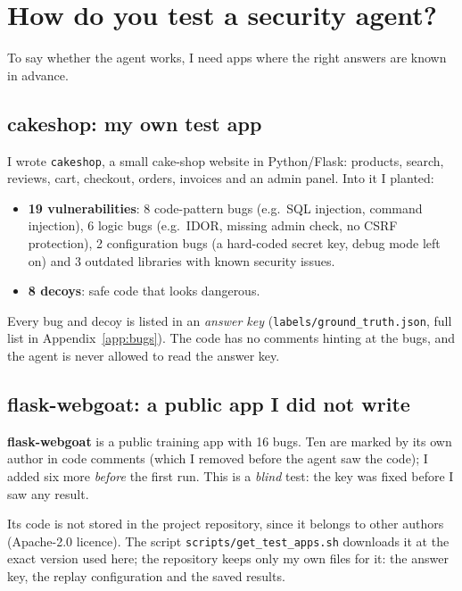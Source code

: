 \documentclass[11pt,a4paper]{article}
\newcommand{\code}[1]{\texttt{#1}}
\begin{document}
\section{How do you test a security agent?}

To say whether the agent works, I need apps where the right answers are known in advance.

\subsection{cakeshop: my own test app}
I wrote \code{cakeshop}, a small cake-shop website in Python/Flask: products, search, reviews, cart,
checkout, orders, invoices and an admin panel. Into it I planted:

\begin{itemize}
  \item \textbf{19 vulnerabilities}: 8 code-pattern bugs (e.g.\ SQL injection, command injection), 6 logic
        bugs (e.g.\ IDOR, missing admin check, no CSRF protection), 2 configuration bugs (a hard-coded
        secret key, debug mode left on) and 3 outdated libraries with known security issues.
  \item \textbf{8 decoys}: safe code that looks dangerous.
\end{itemize}

Every bug and decoy is listed in an \emph{answer key} (\code{labels/ground\_truth.json}, full list in
Appendix~\ref{app:bugs}). The code has no comments hinting at the bugs, and the agent is never allowed to
read the answer key.


\subsection{flask-webgoat: a public app I did not write}
\textbf{flask-webgoat} is a public training app with 16 bugs. Ten are marked by its own author in code comments
(which I removed before the agent saw the code); I added six more \emph{before} the first run. This is a
\emph{blind} test: the key was fixed before I saw any result.

Its code is not stored in the project repository, since it belongs to other authors (Apache-2.0 licence). The
script \code{scripts/get\_test\_apps.sh} downloads it at the exact version used here; the repository keeps only my
own files for it: the answer key, the replay configuration and the saved results.
\end{document}
